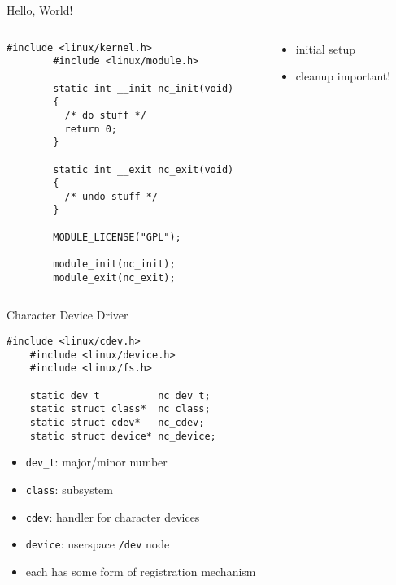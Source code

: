 \documentclass[xcolor=dvipsnames]{beamer}
\begin{document}
\begin{frame}[fragile]{Hello, World!}
  \begin{columns}
    \begin{column}{0.6\textwidth}
      \begin{lstlisting}[gobble=8]
        #include <linux/kernel.h>
        #include <linux/module.h>

        static int __init nc_init(void)
        {
          /* do stuff */
          return 0;
        }

        static int __exit nc_exit(void)
        {
          /* undo stuff */
        }

        MODULE_LICENSE("GPL");

        module_init(nc_init);
        module_exit(nc_exit);

      \end{lstlisting}
    \end{column}
    \begin{column}{0.4\textwidth}
      \begin{itemize}
        \item initial setup
        \item cleanup important!
      \end{itemize}
    \end{column}
  \end{columns}
\end{frame}

\begin{frame}[fragile]{Character Device Driver}
  \begin{lstlisting}[gobble=4]
    #include <linux/cdev.h>
    #include <linux/device.h>
    #include <linux/fs.h>

    static dev_t          nc_dev_t;
    static struct class*  nc_class;
    static struct cdev*   nc_cdev;
    static struct device* nc_device;

  \end{lstlisting}

  \begin{itemize}
    \item<1-> \texttt{dev\_t}: major/minor number
    \item<2-> \texttt{class}: subsystem
    \item<3-> \texttt{cdev}: handler for character devices
    \item<4-> \texttt{device}: userspace \texttt{/dev} node
    \item<5-> each has some form of registration mechanism
  \end{itemize}
\end{frame}
\end{document}
